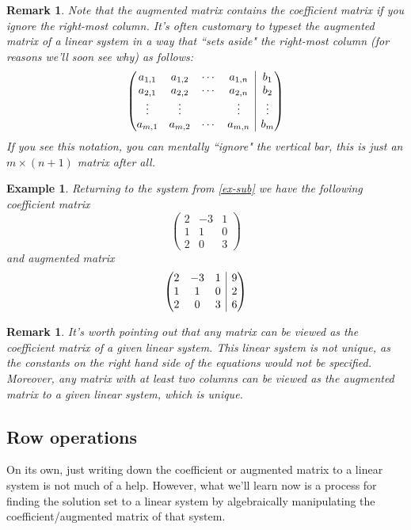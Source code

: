 \documentclass[12pt]{article}
\makeatletter
\numberwithin{equation}{subsection}
\numberwithin{figure}{subsection}
\theoremstyle{note}
\newtheorem{example}[subsection]{Example}
\newtheorem{remark}[subsection]{Remark}
\newenvironment{amatrix}[1]{%
  \left(\begin{array}{@{}*{#1}{c}|c@{}}
}{%
  \end{array}\right)
}
\makeatother
\begin{document}
\begin{remark}Note that the augmented matrix contains the coefficient matrix if you ignore the right-most column. It's often customary to typeset the augmented matrix of a linear system in a way that ``sets aside" the right-most column (for reasons we'll soon see why) as follows:
\begin{equation}\begin{amatrix}{4} a_{1,1} & a_{1,2} & \cdots & a_{1,n} & b_1 \\
a_{2,1} & a_{2,2} & \cdots & a_{2,n} & b_2\\
\vdots & \vdots & & \vdots & \vdots \\
a_{m,1} & a_{m,2} &\cdots & a_{m,n} & b_m
\end{amatrix}\end{equation}
If you see this notation, you can mentally ``ignore" the vertical bar, this is just an $m\times (n+1)$ matrix after all. 
\end{remark}


\begin{example} Returning to the system from \eqref{ex-sub} we have the following coefficient matrix
\[ \begin{pmatrix} 2 & -3 & 1 \\ 1 & 1 & 0 \\ 2 & 0 & 3\end{pmatrix} \]
and augmented matrix \[ \begin{amatrix}{3}  2 & -3 & 1 & 9 \\ 1 & 1 & 0 & 2 \\ 2 & 0 & 3 & 6 \end{amatrix}\]
\end{example}

\begin{remark}It's worth pointing out that any matrix can be viewed as the coefficient matrix of a given linear system. This linear system is not unique, as the constants on the right hand side of the equations would not be specified. Moreover, any matrix with at least two columns can be viewed as the \textit{augmented} matrix to a given linear system, which is unique. 
\end{remark}

\subsection{Row operations}
On its own, just writing down the coefficient or augmented matrix to a linear system is not much of a help. However, what we'll learn now is a process for finding the solution set to a linear system by algebraically manipulating the coefficient/augmented matrix of that system. 
\end{document}
